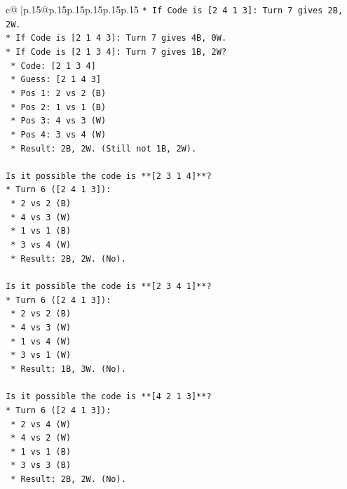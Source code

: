\documentclass{article}
\begin{document}
{\begin{supertabular}{c@{$\;$}|p{.15\linewidth}@{}p{.15\linewidth}p{.15\linewidth}p{.15\linewidth}p{.15\linewidth}p{.15\linewidth}}
{{{\texttt{*   If Code is {[}2 4 1 3{]}: Turn 7 gives 2B, 2W.} \\
\texttt{*   If Code is {[}2 1 4 3{]}: Turn 7 gives 4B, 0W.} \\
\texttt{*   If Code is {[}2 1 3 4{]}: Turn 7 gives 1B, 2W?} \\
\texttt{    *   Code: {[}2 1 3 4{]}} \\
\texttt{    *   Guess: {[}2 1 4 3{]}} \\
\texttt{    *   Pos 1: 2 vs 2 (B)} \\
\texttt{    *   Pos 2: 1 vs 1 (B)} \\
\texttt{    *   Pos 3: 4 vs 3 (W)} \\
\texttt{    *   Pos 4: 3 vs 4 (W)} \\
\texttt{    *   Result: 2B, 2W. (Still not 1B, 2W).} \\
\\ 
\texttt{Is it possible the code is **{[}2 3 1 4{]}**?} \\
\texttt{*   Turn 6 ({[}2 4 1 3{]}):} \\
\texttt{    *   2 vs 2 (B)} \\
\texttt{    *   4 vs 3 (W)} \\
\texttt{    *   1 vs 1 (B)} \\
\texttt{    *   3 vs 4 (W)} \\
\texttt{    *   Result: 2B, 2W. (No).} \\
\\ 
\texttt{Is it possible the code is **{[}2 3 4 1{]}**?} \\
\texttt{*   Turn 6 ({[}2 4 1 3{]}):} \\
\texttt{    *   2 vs 2 (B)} \\
\texttt{    *   4 vs 3 (W)} \\
\texttt{    *   1 vs 4 (W)} \\
\texttt{    *   3 vs 1 (W)} \\
\texttt{    *   Result: 1B, 3W. (No).} \\
\\ 
\texttt{Is it possible the code is **{[}4 2 1 3{]}**?} \\
\texttt{*   Turn 6 ({[}2 4 1 3{]}):} \\
\texttt{    *   2 vs 4 (W)} \\
\texttt{    *   4 vs 2 (W)} \\
\texttt{    *   1 vs 1 (B)} \\
\texttt{    *   3 vs 3 (B)} \\
\texttt{    *   Result: 2B, 2W. (No).} \\
}}}
\end{supertabular}}
\end{document}
